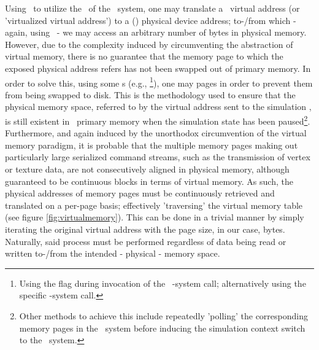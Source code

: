 Using \dvttermsimics\ to utilize the \dvttermmmu\ of the \dvttermtarget\ system, one may translate a \dvttermtarget\ virtual address (or 'virtualized virtual address') to a (\dvttermtarget ) physical device address; to-/from which - again, using \dvttermsimics\ - we may access an arbitrary number of bytes in physical memory.
However, due to the complexity induced by circumventing the abstraction of virtual memory, there is no guarantee that the memory page to which the exposed physical address refers has not been swapped out of primary memory.
In order to solve this, using some \dvttermos s (e.g., \dvttermfedora \footnote{Using the  flag during invocation of the \dvttermlinux\ -system call; alternatively using the specific -system call.}), one may  pages in order to prevent them from being swapped to disk.
This is the methodology used to ensure that the physical memory space, referred to by the virtual address sent to the simulation \dvttermhost , is still existent in \dvttermtarget\ primary memory when the simulation state has been paused\footnote{Other methods to achieve this include repeatedly 'polling' the corresponding memory pages in the \dvttermtarget\ system before inducing the simulation context switch to the \dvttermhost\ system.}.
Furthermore, and again induced by the unorthodox circumvention of the virtual memory paradigm, it is probable that the multiple memory pages making out particularly large serialized command streams, such as the transmission of vertex or texture data, are not consecutively aligned in physical memory, although guaranteed to be continuous blocks in terms of virtual memory.
As such, the physical addresses of memory pages must be continuously retrieved and translated on a per-page basis; effectively 'traversing' the virtual memory table (see figure \ref{fig:virtualmemory}).
This can be done in a trivial manner by simply iterating the original virtual address with the \textit{\dvttermtarget } page size, in our case,  bytes.
Naturally, said process must be performed regardless of data being read or written to-/from the intended - physical - memory space.


